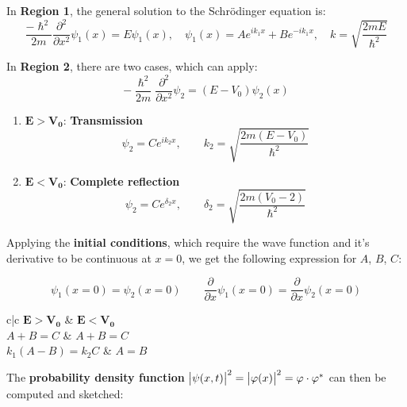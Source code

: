 \documentclass{article}
\begin{document}
\begin{twocolumn}
In \textbf{Region 1}, the general solution to the Schrödinger equation is:
$$\frac{-\hslash^2}{2m} \frac{\partial^2}{\partial x^2} \psi_1(x) = E \psi_1(x), \quad \psi_1(x) = A e^{i k_1 x} + B e^{-i k_1 x}, \quad k = \sqrt{\frac{2 m E}{\hslash^2}}$$

In \textbf{Region 2}, there are two cases, which can apply:
$$-\frac{\hslash^2}{2m} \frac{\partial^2}{\partial x^2} \psi_2 = (E - V_0) \psi_2(x)$$

\begin{enumerate}
	\item $\mathbf{E > V_0}$: \textbf{Transmission}
	$$\psi_2 = C e^{i k_2 x}, \qquad k_2 = \sqrt{\frac{2 m (E - V_0)}{\hslash^2}}$$
	\item $\mathbf{E < V_0}$: \textbf{Complete reflection}
	$$\psi_2 = C e^{\delta_2 x}, \qquad \delta_2 = \sqrt{\frac{2 m (V_0 - 2)}{\hslash^2}}$$
\end{enumerate}

Applying the \textbf{initial conditions}, which require the wave function and it's derivative to be continuous at $x = 0$, we get the following expression for $A$, $B$, $C$:

$$\psi_1(x=0) = \psi_2(x=0) \qquad \frac{\partial }{\partial x} \psi_1(x=0) = \frac{\partial}{\partial x} \psi_2(x=0)$$

\begin{center}
\begin{mtabular}{c|c}
	$\mathbf{E > V_0}$ & $\mathbf{E < V_0}$ \\
	$A + B = C$ & $A + B = C$ \\
	$k_1 (A - B) = k_2 C$ & $A = B$ \\
\end{mtabular}
\end{center}

The \textbf{probability density function} $\left| \psi(x,t) \right|^2 = \left| \varphi(x) \right|^2 = \varphi \cdot \varphi^\ast$ can then be computed and sketched:


\end{twocolumn}
\end{document}
